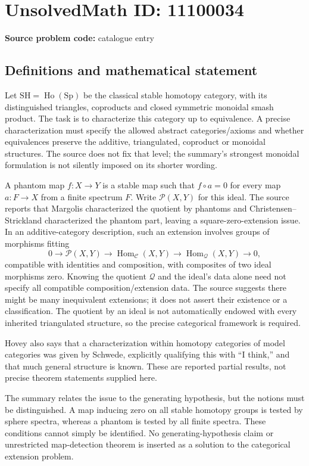 \documentclass[11pt]{article}
\begin{document}
\section*{UnsolvedMath ID: 11100034}
\textbf{Source problem code:} catalogue entry
\subsection{Definitions and mathematical statement}
Let \(\mathrm{SH}=\operatorname{Ho}(\mathrm{Sp})\) be the classical stable homotopy category, with its distinguished triangles, coproducts and closed symmetric monoidal smash product. The task is to characterize this category up to equivalence. A precise characterization must specify the allowed abstract categories/axioms and whether equivalences preserve the additive, triangulated, coproduct or monoidal structures. The source does not fix that level; the summary's strongest monoidal formulation is not silently imposed on its shorter wording.

A phantom map \(f:X\to Y\) is a stable map such that \(f\circ a=0\) for every map \(a:F\to X\) from a finite spectrum \(F\). Write \(\mathcal P(X,Y)\) for this ideal. The source reports that Margolis characterized the quotient by phantoms and Christensen--Strickland characterized the phantom part, leaving a square-zero-extension issue. In an additive-category description, such an extension involves groups of morphisms fitting
\[0\to\mathcal P(X,Y)\to\operatorname{Hom}_{\mathcal C}(X,Y)
\to\operatorname{Hom}_{\mathcal Q}(X,Y)\to0,\]
compatible with identities and composition, with composites of two ideal morphisms zero. Knowing the quotient \(\mathcal Q\) and the ideal's data alone need not specify all compatible composition/extension data. The source suggests there might be many inequivalent extensions; it does not assert their existence or a classification. The quotient by an ideal is not automatically endowed with every inherited triangulated structure, so the precise categorical framework is required.

Hovey also says that a characterization within homotopy categories of model categories was given by Schwede, explicitly qualifying this with ``I think,'' and that much general structure is known. These are reported partial results, not precise theorem statements supplied here.

The summary relates the issue to the generating hypothesis, but the notions must be distinguished. A map inducing zero on all stable homotopy groups is tested by sphere spectra, whereas a phantom is tested by all finite spectra. These conditions cannot simply be identified. No generating-hypothesis claim or unrestricted map-detection theorem is inserted as a solution to the categorical extension problem.
\end{document}
